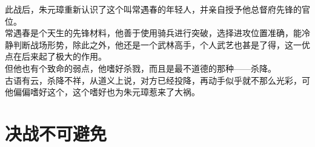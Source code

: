 \begin{multicols}{\theparacolNo}
此战后，朱元璋重新认识了这个叫常遇春的年轻人，并亲自授予他总督府先锋的官位。\\

常遇春是个天生的先锋材料，他善于使用骑兵进行突破，选择进攻位置准确，能冷静判断战场形势，除此之外，他还是一个武林高手，个人武艺也甚是了得，这一优点在后来起了极大的作用。\\

但他也有个致命的弱点，他嗜好杀戮，而且是最不道德的那种——杀降。\\

古语有云，杀降不祥，从道义上说，对方已经投降，再动手似乎就不那么光彩，可他偏偏嗜好这个，这个嗜好也为朱元璋惹来了大祸。\\
\ifnum{}
	\end{multicols}
\fi
\newpage
\section{决战不可避免}
\ifnum{}
